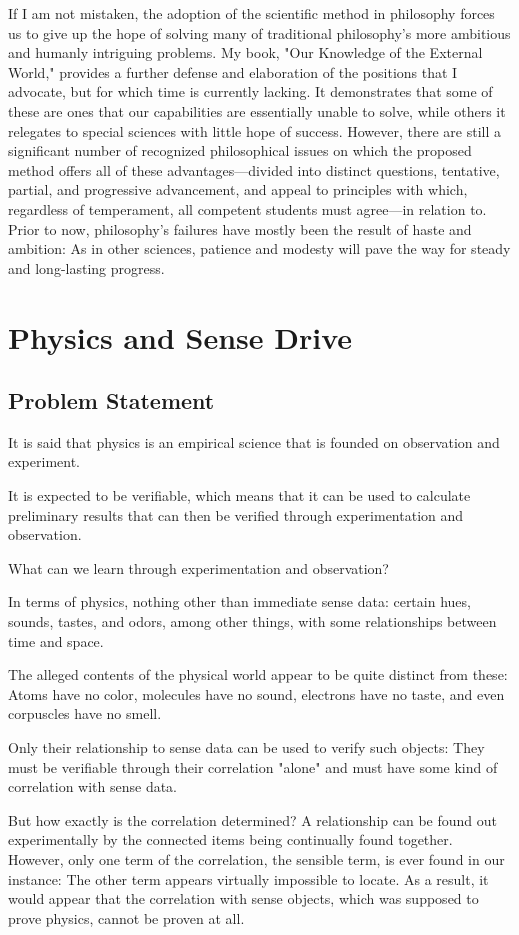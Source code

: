 \documentclass[a4paper,12pt]{book}[2004/02/16]
\theoremstyle{ilemma}
\theoremstyle{itheorem}
\theoremstyle{iother}
\theoremstyle{icorollary}
\theoremstyle{numcorollary}
\theoremstyle{idefinition}
\begin{document}
If I am not mistaken, the adoption of the scientific method in philosophy forces us to give up the hope of solving many of traditional philosophy's more ambitious and humanly intriguing problems. My book, "Our Knowledge of the External World," provides a further defense and elaboration of the positions that I advocate, but for which time is currently lacking. It demonstrates that some of these are ones that our capabilities are essentially unable to solve, while others it relegates to special sciences with little hope of success. However, there are still a significant number of recognized philosophical issues on which the proposed method offers all of these advantages—divided into distinct questions, tentative, partial, and progressive advancement, and appeal to principles with which, regardless of temperament, all competent students must agree—in relation to. Prior to now, philosophy's failures have mostly been the result of haste and ambition: As in other sciences, patience and modesty will pave the way for steady and long-lasting progress.

\chapter{Physics and Sense Drive}
\section{Problem Statement}
It is said that physics is an empirical science that is founded on observation and experiment.

It is expected to be verifiable, which means that it can be used to calculate preliminary results that can then be verified through experimentation and observation.

What can we learn through experimentation and observation?

In terms of physics, nothing other than immediate sense data: certain hues, sounds, tastes, and odors, among other things, with some relationships between time and space.

The alleged contents of the physical world appear to be quite distinct from these: Atoms have no color, molecules have no sound, electrons have no taste, and even corpuscles have no smell.

Only their relationship to sense data can be used to verify such objects: They must be verifiable through their correlation "alone" and must have some kind of correlation with sense data.

But how exactly is the correlation determined? A relationship can
be found out experimentally by the connected items being continually
found together. However, only one term of the correlation, the sensible term, is ever found in our instance: The other term appears virtually impossible to locate. As a result, it would appear that the correlation with sense objects, which was supposed to prove physics, cannot be proven at all.
\end{document}
